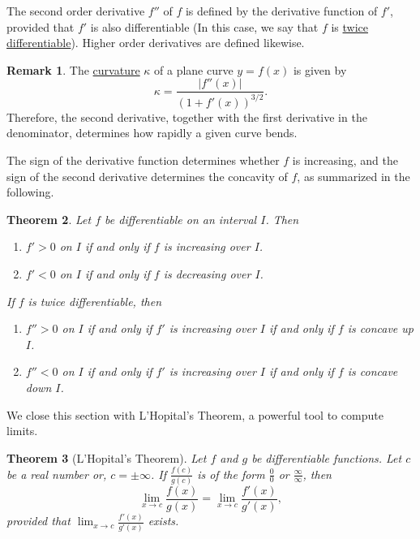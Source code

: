 \documentclass[12pt,letterpaper]{book}
\numberwithin{equation}{section}
\newtheorem{thm}{\textbf{Theorem}}[section]
\theoremstyle{definition}
\newtheorem{remark}[thm]{\textbf{Remark}}
\begin{document}
The second order derivative $f''$ of $f$ is defined by the derivative function of $f'$, provided that $f'$ is also differentiable (In this case, we say that $f$ is \underline{twice differentiable}). Higher order derivatives are defined likewise.

\begin{remark}
The \underline{curvature} $\kappa$ of a plane curve $y=f(x)$ is given by
$$\kappa=\frac{|f''(x)|}{(1+f'(x))^{3/2}}.$$
Therefore, the second derivative, together with the first derivative in the denominator, determines how rapidly a given curve bends.
\end{remark}

The sign of the derivative function determines whether $f$ is increasing, and the sign of the second derivative determines the concavity of $f$, as summarized in the following.

\begin{thm}\label{derivatives and original} Let $f$ be differentiable on an interval $I$. Then
\begin{enumerate}
\item $f'>0$ on $I$ if and only if $f$ is increasing over $I$.
\item $f'<0$ on $I$ if and only if $f$ is decreasing over $I$.
\end{enumerate}

If $f$ is twice differentiable, then
\begin{enumerate}
\item $f''>0$ on $I$ if and only if $f'$ is increasing over $I$ if and only if $f$ is concave up $I$.
\item $f''<0$ on $I$ if and only if $f'$ is increasing over $I$ if and only if $f$ is concave down $I$.
\end{enumerate}
\end{thm}

We close this section with L'Hopital's Theorem, a powerful tool to compute limits.

\begin{thm}[L'Hopital's Theorem] Let $f$ and $g$ be differentiable functions. Let $c$ be a real number or, $c=\pm \infty$. If $\frac{f(c)}{g(c)}$ is of the form $\frac{0}{0}$ or $\frac{\infty}{\infty}$, then
$$\lim_{x\to c}\frac{f(x)}{g(x)}=\lim_{x\to c}\frac{f'(x)}{g'(x)},$$
provided that $\displaystyle{\lim_{x\to c}\frac{f'(x)}{g'(x)}}$ exists.
\end{thm}
\end{document}
